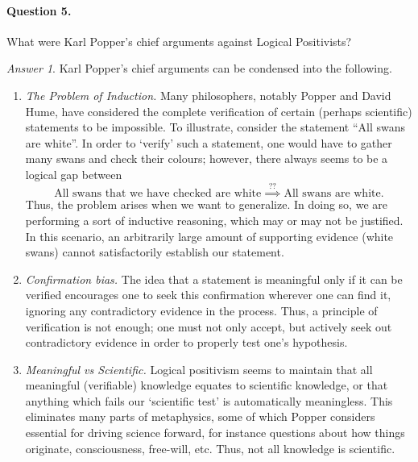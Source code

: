 \documentclass[11pt]{article}
\theoremstyle{remark}
\newtheorem*{answer}{Answer}
\begin{document}
    \paragraph{Question 5.} What were Karl Popper's chief arguments against Logical
    Positivists?
    \begin{answer}
        Karl Popper's chief arguments can be condensed into the following.
        \begin{enumerate}
            \item \emph{The Problem of Induction.} Many philosophers, notably
            Popper and David Hume, have considered the complete verification of
            certain (perhaps scientific) statements to be impossible. To illustrate,
            consider the statement ``All swans are white''. In order to `verify' such
            a statement, one would have to gather many swans and check their colours;
            however, there always seems to be a logical gap between \[
                \text{All swans that we have checked are white}
                \stackrel{??}{\implies} \text{All swans are white}.
            \] Thus, the problem arises when we want to generalize. In doing so, we
            are performing a sort of inductive reasoning, which may or may not be
            justified. In this scenario, an arbitrarily large amount of supporting
            evidence (white swans) cannot satisfactorily establish our statement.

            \item \emph{Confirmation bias.} The idea that a statement is meaningful
            only if it can be verified encourages one to seek this confirmation
            wherever one can find it, ignoring any contradictory evidence in the
            process. Thus, a principle of verification is not enough; one must not
            only accept, but actively seek out contradictory evidence in order to
            properly test one's hypothesis.

            \item \emph{Meaningful vs Scientific.} Logical positivism seems to
            maintain that all meaningful (verifiable) knowledge equates to scientific
            knowledge, or that anything which fails our `scientific test' is
            automatically meaningless. This eliminates many parts of metaphysics,
            some of which Popper considers essential for driving science forward, for
            instance questions about how things originate, consciousness, free-will,
            etc. Thus, not all knowledge is scientific.
        \end{enumerate}


\end{answer}
\end{document}
